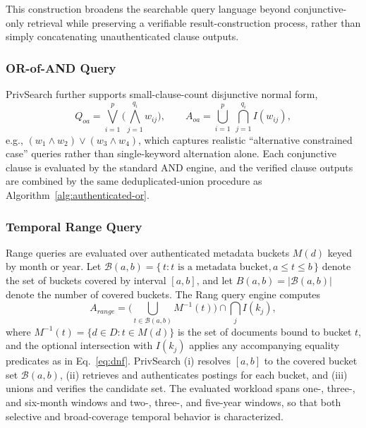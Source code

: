 This construction broadens the searchable query language beyond conjunctive-only retrieval while preserving a verifiable result-construction process, rather than simply concatenating unauthenticated clause outputs.

\subsubsection{OR-of-AND Query}
\label{3C3}
PrivSearch further supports small-clause-count disjunctive normal form,
\begin{equation}
Q_{oa} = \bigvee_{i=1}^{p}\Big(\bigwedge_{j=1}^{q_i} w_{ij}\Big), \qquad
A_{oa} = \bigcup_{i=1}^{p}\ \bigcap_{j=1}^{q_i} I(w_{ij}),
\label{eq:qoa}
\end{equation}
e.g., $(w_1 \wedge w_2) \lor (w_3 \wedge w_4)$, which captures realistic ``alternative constrained case'' queries rather than single-keyword alternation alone. Each conjunctive clause is evaluated by the standard AND engine, and the verified clause outputs are combined by the same deduplicated-union procedure as Algorithm~\ref{alg:authenticated-or}.

\subsubsection{Temporal Range Query}
\label{3C4}
Range queries are evaluated over authenticated metadata buckets $M(d)$ keyed by month or year. Let $\mathcal{B}(a,b) = \{\, t : t \text{ is a metadata bucket}, a \le t \le b \,\}$ denote the set of buckets covered by interval $[a,b]$, and let $B(a,b)=|\mathcal{B}(a,b)|$ denote the number of covered buckets. The Rang query engine computes
\begin{equation}
A_{range} = \Big(\bigcup_{t \in \mathcal{B}(a,b)} M^{-1}(t)\Big) \cap \bigcap_{j} I(k_j),
\label{eq:qrange}
\end{equation}
where $M^{-1}(t)=\{d \in D : t \in M(d)\}$ is the set of documents bound to bucket $t$, and the optional intersection with $I(k_j)$ applies any accompanying equality predicates as in Eq.~\eqref{eq:dnf}. PrivSearch (i) resolves $[a,b]$ to the covered bucket set $\mathcal{B}(a,b)$, (ii) retrieves and authenticates postings for each bucket, and (iii) unions and verifies the candidate set. The evaluated workload spans one-, three-, and six-month windows and two-, three-, and five-year windows, so that both selective and broad-coverage temporal behavior is characterized.

